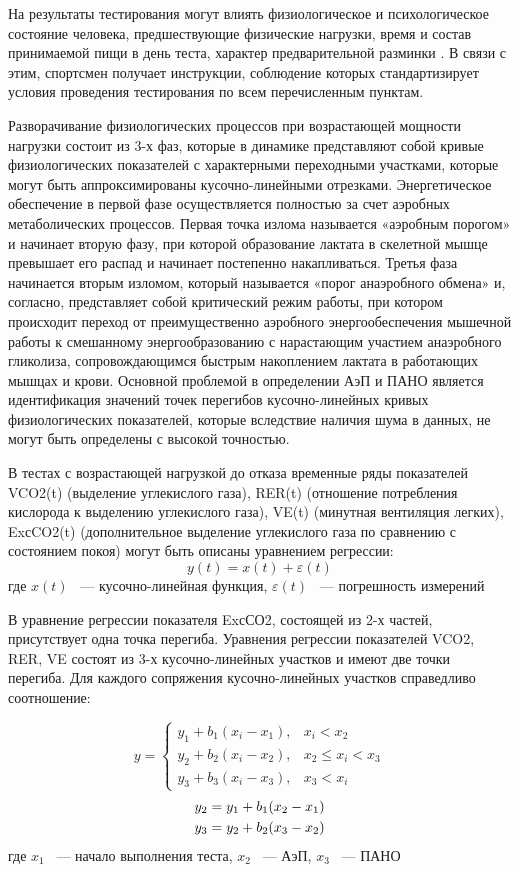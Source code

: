 На результаты тестирования могут влиять физиологическое и психологическое состояние человека, предшествующие физические нагрузки, время и состав принимаемой пищи в день теста, характер предварительной разминки \cite{Burnley2002}. В связи с этим, спортсмен получает инструкции, соблюдение которых стандартизирует условия проведения тестирования по всем перечисленным пунктам. 

Разворачивание физиологических процессов при возрастающей мощности нагрузки состоит из 3-х фаз, которые в динамике представляют собой кривые физиологических показателей с характерными переходными участками, которые могут быть аппроксимированы кусочно-линейными отрезками. Энергетическое обеспечение в первой фазе осуществляется полностью за счет аэробных метаболических процессов. Первая точка излома называется «аэробным порогом» и начинает вторую фазу, при которой образование лактата в скелетной мышце превышает его распад и начинает постепенно накапливаться. Третья фаза начинается вторым изломом, который называется «порог анаэробного обмена» и, согласно, представляет собой критический режим работы, при котором происходит переход от преимущественно аэробного энергообеспечения мышечной работы к смешанному энергообразованию с нарастающим участием анаэробного гликолиза, сопровождающимся быстрым накоплением лактата в работающих мышцах и крови.
Основной проблемой в определении АэП и ПАНО является идентификация значений точек перегибов кусочно-линейных кривых физиологических показателей, которые вследствие наличия шума в данных, не могут быть определены с высокой точностью. 

В тестах с возрастающей нагрузкой до отказа временные ряды показателей VCO2(t) (выделение углекислого газа), RER(t) (отношение потребления кислорода к выделению углекислого газа), VE(t) (минутная вентиляция легких), ExсCO2(t) (дополнительное выделение углекислого газа по сравнению с состоянием покоя) могут быть описаны уравнением регрессии:
\begin{equation}
y(t)=x(t)+\varepsilon(t)
\end{equation}
где \(x(t)\) ~--- кусочно-линейная функция, \(\varepsilon(t)\) ~--- погрешность измерений

В уравнение регрессии показателя ExсСО2, состоящей из 2-х частей, присутствует одна точка перегиба. Уравнения регрессии показателей VCO2, RER, VE состоят из 3-х кусочно-линейных участков и имеют две точки перегиба. 
Для каждого сопряжения кусочно-линейных участков справедливо соотношение:

\begin{equation}
y=\begin{cases}
y_{1}+b_{1}(x_{i}-x_{1}), & x_{i} < x_{2} \\
y_{2}+b_{2}(x_{i}-x_{2}), & x_{2} \le x_{i} < x_{3} \\
y_{3}+b_{3}(x_{i}-x_{3}), & x_{3} < x_{i} 
\end{cases}
\end{equation}
\begin{gather}
y_{2}=y_{1}+b_{1}(x_{2}-x_{1}) \notag \\
y_{3}=y_{2}+b_{2}(x_{3}-x_{2}) \notag
\end{gather}
где \(x_{1}\) ~--- начало выполнения теста, \(x_{2}\) ~--- АэП, \(x_{3}\) ~--- ПАНО 

